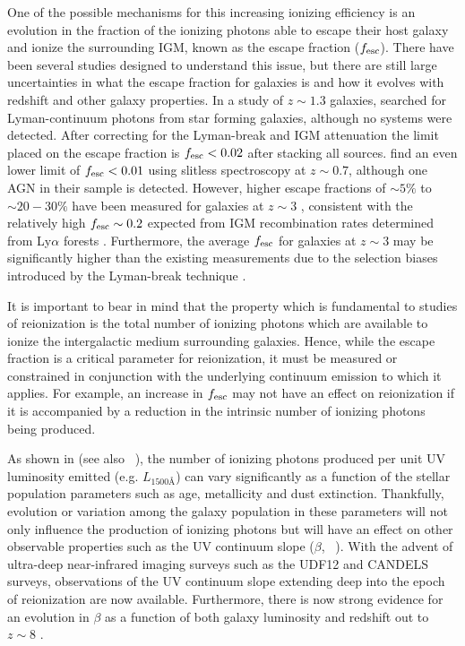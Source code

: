 One of the possible mechanisms for this increasing ionizing efficiency is an evolution in the fraction of the ionizing photons able to escape their host galaxy and ionize the surrounding IGM, known as the escape fraction ($f_{\rm{esc}}$). There have been several studies designed to understand this issue, but there are still large uncertainties in what the escape fraction for galaxies is and how it evolves with redshift and other galaxy properties. In a study of $z \sim 1.3$ galaxies, \citet{Siana:2010bo} searched for Lyman-continuum photons from star forming galaxies, although no systems were detected.  After correcting for the Lyman-break and IGM attenuation the limit placed on the escape fraction is $f_{\rm esc} < 0.02$ after stacking all sources. \citet{Bridge:2010ie} find an even lower limit of $f_{\rm esc} < 0.01$ using slitless spectroscopy at $z \sim 0.7$, although one AGN in their sample is detected. However, higher escape fractions of $\sim5\%$ to $\sim20-30\%$ have been measured for galaxies at $z \sim 3$  \citep{Shapley:2006cq,Iwata:2009dy,Vanzella:2010jk,Nestor:2013kw}, consistent with the relatively high $f_{\rm esc} \sim 0.2$ expected from IGM recombination rates determined from Ly$\alpha$ forests \citep{Bolton:2007gc}. Furthermore, the average $f_{\rm{esc}}$ for galaxies at $z\sim3$ may be significantly higher than the existing measurements due to the selection biases introduced by the Lyman-break technique \citep{Cooke:2014dd}. 

It is important to bear in mind that the property which is fundamental to studies of reionization is the total number of ionizing photons which are available to ionize the intergalactic medium surrounding galaxies. Hence, while the escape fraction is a critical parameter for reionization, it must be measured or constrained in conjunction with the underlying continuum emission to which it applies. For example, an increase in $f_{\rm{esc}}$ may not have an effect on reionization if it is accompanied by a reduction in the intrinsic number of ionizing photons being produced.

As shown in \citet{Robertson:2013ji} (see also \citeauthor{Leitherer:1999jt}~\citeyear{Leitherer:1999jt}), the number of ionizing photons produced per unit UV luminosity emitted (e.g. $L_{1500\text{\AA}}$) can vary significantly as a function of the stellar population parameters such as age, metallicity and dust extinction. Thankfully, evolution or variation among the galaxy population in these parameters will not only influence the production of ionizing photons but will have an effect on other observable properties such as the UV continuum slope ($\beta$, \citeauthor{1994ApJ...429..582C}~\citeyear{1994ApJ...429..582C}).
With the advent of ultra-deep near-infrared imaging surveys such as the UDF12 \citep{Koekemoer:2013db} and CANDELS \citep{2011ApJS..197...35G,Koekemoer:2011br} surveys, observations of the UV continuum slope extending deep into the epoch of reionization are now available. Furthermore, there is now strong evidence for an evolution in $\beta$ as a function of both galaxy luminosity and redshift out to $z\sim 8$ \citep{Bouwens:2013vf,Rogers:2014bn}.

